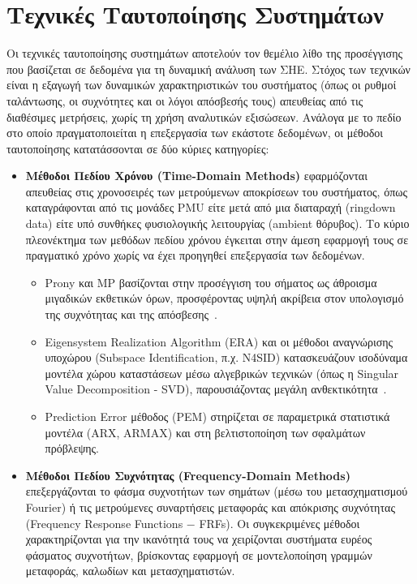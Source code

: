 \section{Τεχνικές Ταυτοποίησης Συστημάτων}

Οι τεχνικές ταυτοποίησης συστημάτων αποτελούν τον θεμέλιο λίθο της προσέγγισης που βασίζεται σε δεδομένα για τη δυναμική ανάλυση των ΣΗΕ. Στόχος των τεχνικών είναι η εξαγωγή των δυναμικών χαρακτηριστικών του συστήματος (όπως οι ρυθμοί ταλάντωσης, οι συχνότητες και οι λόγοι απόσβεσής τους) απευθείας από τις διαθέσιμες μετρήσεις, χωρίς τη χρήση αναλυτικών εξισώσεων. Ανάλογα με το πεδίο στο οποίο πραγματοποιείται η επεξεργασία των εκάστοτε δεδομένων, οι μέθοδοι ταυτοποίησης κατατάσσονται σε δύο κύριες κατηγορίες:

\begin{itemize}
    \item \textbf{Μέθοδοι Πεδίου Χρόνου (Time-Domain Methods)} εφαρμόζονται απευθείας στις χρονοσειρές των μετρούμενων αποκρίσεων του συστήματος, όπως καταγράφονται από τις μονάδες PMU είτε μετά από μια διαταραχή (ringdown data) είτε υπό συνθήκες φυσιολογικής λειτουργίας (ambient θόρυβος). Το κύριο πλεονέκτημα των μεθόδων πεδίου χρόνου έγκειται στην άμεση εφαρμογή τους σε πραγματικό χρόνο χωρίς να έχει προηγηθεί επεξεργασία των δεδομένων.

    \begin{itemize}
        \item Prony και \textenglish{MP} βασίζονται στην προσέγγιση του σήματος ως άθροισμα μιγαδικών εκθετικών όρων, προσφέροντας υψηλή ακρίβεια στον υπολογισμό της συχνότητας και της απόσβεσης~\cite{hua1990matrix,modal2018}.

        \item Eigensystem Realization Algorithm (ERA) και οι μέθοδοι αναγνώρισης υποχώρου (\textenglish{Subspace Identification}, π.χ. N4SID) κατασκευάζουν ισοδύναμα μοντέλα χώρου καταστάσεων μέσω αλγεβρικών τεχνικών (όπως η Singular Value Decomposition - SVD), παρουσιάζοντας μεγάλη ανθεκτικότητα~\cite{juang1985ERA,n4sid1994}.

        \item Prediction Error μέθοδος (PEM) στηρίζεται σε παραμετρικά στατιστικά μοντέλα (ARX, ARMAX) και στη βελτιστοποίηση των σφαλμάτων πρόβλεψης.
    \end{itemize}

    \item \textbf{Μέθοδοι Πεδίου Συχνότητας (Frequency-Domain Methods)} επεξεργάζονται το φάσμα συχνοτήτων των σημάτων (μέσω του μετασχηματισμού Fourier) ή τις μετρούμενες συναρτήσεις μεταφοράς και απόκρισης συχνότητας (Frequency Response Functions $-$ FRFs). Οι συγκεκριμένες μέθοδοι χαρακτηρίζονται για την ικανότητά τους να χειρίζονται συστήματα ευρέος φάσματος συχνοτήτων, βρίσκοντας εφαρμογή σε μοντελοποίηση γραμμών μεταφοράς, καλωδίων και μετασχηματιστών.


\end{itemize}
